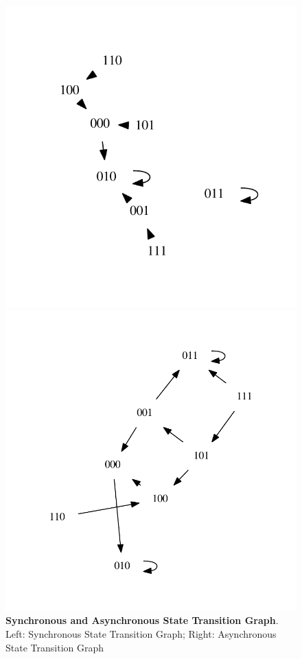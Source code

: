 \begin{figure}[h]
  \centering
 \begin{varwidth}{\linewidth}
    \includegraphics[scale=.5]{./Bilder/example01_synchron_stg}
  \end{varwidth} %
  \begin{varwidth}{\linewidth}
    \includegraphics[scale=.4]{./Bilder/example01_asynchron_stg}
  \end{varwidth}
  \caption[Synchronous and Asynchronous State Transition Graph]{\textbf{Synchronous and Asynchronous State Transition Graph}. Left: Synchronous State Transition Graph; Right: Asynchronous State Transition Graph}
\label{fig:Fig.4.}
\end{figure}


